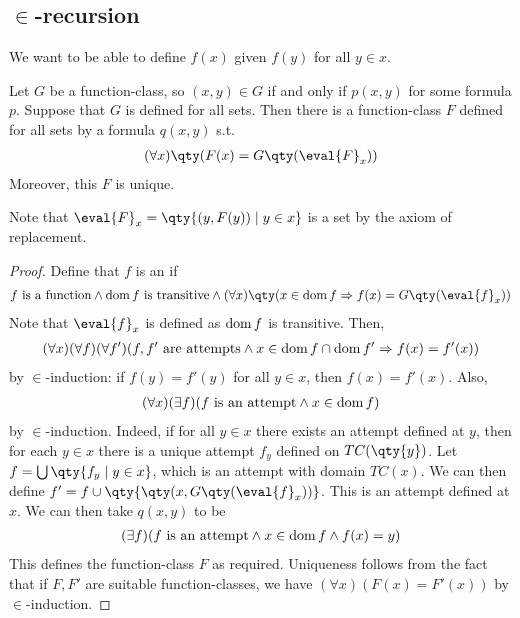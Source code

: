 \subsection{\texorpdfstring{$\in$}{∈}-recursion}
We want to be able to define $f(x)$ given $f(y)$ for all $y \in x$.
\begin{theorem}
    Let $G$ be a function-class, so $(x,y) \in G$ if and only if $p(x,y)$ for some formula $p$.
    Suppose that $G$ is defined for all sets.
    Then there is a function-class $F$ defined for all sets by a formula $q(x,y)$ s.t.
    \begin{align*}
        (\forall x)\qty(F(x) = G\qty(\eval{F}_x))
    \end{align*}
    Moreover, this $F$ is unique.
\end{theorem}
Note that $\eval{F}_x = \qty{(y, F(y)) \mid y \in x}$ is a set by the axiom of replacement.
\begin{proof}
    Define that $f$ is an  if
    \begin{align*}
        f \text{ is a function} \wedge \dom f \text{ is transitive} \wedge (\forall x)\qty(x \in \dom f \Rightarrow f(x) = G\qty(\eval{f}_x))
    \end{align*}
    Note that $\eval{f}_x$ is defined as $\operatorname{dom} f$ is transitive.
    Then,
    \begin{align*}
        (\forall x)(\forall f)(\forall f')(f, f' \text{ are attempts} \wedge x \in \operatorname{dom} f \cap \operatorname{dom} f' \Rightarrow f(x) = f'(x))
    \end{align*}
    by $\in$-induction: if $f(y) = f'(y)$ for all $y \in x$, then $f(x) = f'(x)$.
    Also,
    \begin{align*}
        (\forall x)(\exists f)(f \text{ is an attempt} \wedge x \in \operatorname{dom} f)
    \end{align*}
    by $\in$-induction.
    Indeed, if for all $y \in x$ there exists an attempt defined at $y$, then for each $y \in x$ there is a unique attempt $f_y$ defined on $TC(\qty{y})$.
    Let $f = \bigcup\qty{f_y \mid y \in x}$, which is an attempt with domain $TC(x)$.
    We can then define $f' = f \cup \qty{\qty(x, G\qty(\eval{f}_x))}$.
    This is an attempt defined at $x$.
    We can then take $q(x,y)$ to be
    \begin{align*}
        (\exists f)(f \text{ is an attempt} \wedge x \in \operatorname{dom} f \wedge f(x) = y)
    \end{align*}
    This defines the function-class $F$ as required.
    Uniqueness follows from the fact that if $F, F'$ are suitable function-classes, we have $(\forall x)(F(x) = F'(x))$ by $\in$-induction.
\end{proof}

